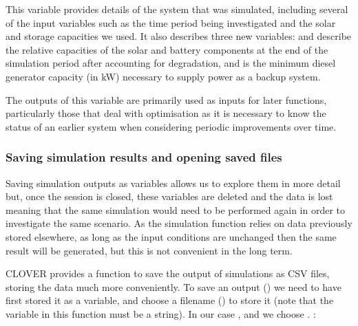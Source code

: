 \documentclass[letterpaper,10pt,english]{sphinxmanual}
\begin{document}
\begin{DUlineblock}{0em}
\item[] 
\end{DUlineblock}

\sphinxAtStartPar
This variable provides details of the system that was simulated,
including several of the input variables such as the time period being
investigated and the solar and storage capacities we used. It also
describes three new variables:  and
 describe the relative capacities of the solar and
battery components at the end of the simulation period after accounting
for degradation, and  is the minimum diesel generator
capacity (in kW) necessary to supply power as a backup system.

\sphinxAtStartPar
The outputs of this variable are primarily used as inputs for later
functions, particularly those that deal with optimisation as it is
necessary to know the status of an earlier system when considering
periodic improvements over time.


\subsubsection{Saving simulation results and opening saved files}
\label{\detokenize{energy_system_simulation:saving-simulation-results-and-opening-saved-files}}
\sphinxAtStartPar
Saving simulation outputs as variables allows us to explore them in more
detail but, once the session is closed, these variables are deleted and
the data is lost \sphinxhyphen{} meaning that the same simulation would need to be
performed again in order to investigate the same scenario. As the
simulation function relies on data previously stored elsewhere, as long
as the input conditions are unchanged then the same result will be
generated, but this is not convenient in the long term.

\sphinxAtStartPar
CLOVER provides a function to save the output of simulations as CSV
files, storing the data much more conveniently. To save an output
() we need to have first stored it as a variable, and
choose a filename () to store it (note that the 
variable in this function must be a string). In our case
, and we choose
. :
\end{document}
